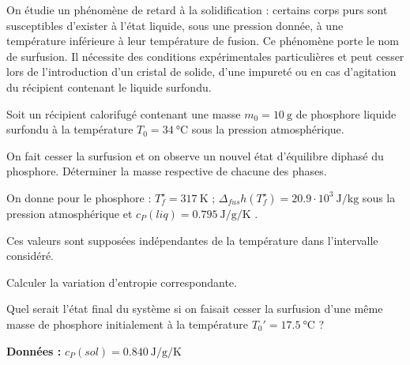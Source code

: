 \begin{exercise}

On étudie un phénomène de \og retard à la solidification \fg{} : certains corps purs sont susceptibles d'exister à l'état liquide, sous une pression donnée, à une température inférieure à leur température de fusion. Ce phénomène porte le nom de surfusion. Il nécessite des conditions expérimentales particulières et peut cesser lors de l'introduction d'un cristal de solide, d'une impureté ou en cas d'agitation du récipient contenant le liquide surfondu.

Soit un récipient calorifugé contenant une masse $m_0 = 10 ~ \si{\gram}$ de phosphore liquide surfondu à la température $T_0 = 34 ~ \si{\celsius}$ sous la pression atmosphérique.

\begin{questions}
\question On fait cesser la surfusion et on observe un nouvel état d'équilibre diphasé du phosphore. Déterminer la masse respective de chacune des phases.


On donne pour le phosphore : $T^\star_f = 317 ~ \si{\kelvin}$ ; $\Delta_{fus} h (T^\star_f ) = 20.9 \cdot 10^3 ~ \si{\joule\per\kilo\gram}$ sous la pression atmosphérique et $c_P (liq) = 0.795  ~ \si{\joule\per\gram\per\kelvin}$ .

Ces valeurs sont supposées indépendantes de la température dans l'intervalle considéré.

\question Calculer la variation d'entropie correspondante.

\question Quel serait l'état final du système si on faisait cesser la surfusion d'une même masse de phosphore initialement à la température $T_0' = 17.5 ~ \si{\celsius}$ ?
\end{questions}

\textbf{Données :} $c_P (sol) = 0.840 ~ \si{\joule\per\gram\per\kelvin}$

\end{exercise}